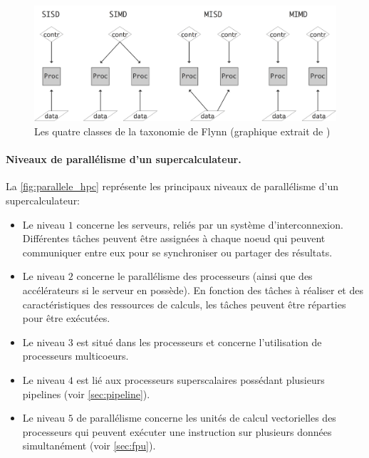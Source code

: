             
            \begin{figure}
            \center
            \includegraphics[width=12cm]{images/flynn.png}
            \caption{\label{fig:flynn} Les quatre classes de la taxonomie de Flynn (graphique extrait de \cite{Eijkhout2013})}
            \end{figure}
            

        \paragraph{Niveaux de parallélisme d'un supercalculateur.}
            La \autoref{fig:parallele_hpc} représente les principaux niveaux de parallélisme d'un supercalculateur:
            \begin{itemize}
                \item Le  niveau $1$ concerne les serveurs, reliés par un système d'interconnexion. Différentes tâches peuvent être assignées à chaque noeud qui peuvent communiquer entre eux pour se synchroniser ou partager des résultats. 
                
                \item Le niveau $2$ concerne le parallélisme des processeurs (ainsi que des accélérateurs si le serveur en possède). En fonction des tâches à réaliser et des caractéristiques des ressources de calculs, les tâches peuvent être réparties pour être exécutées.
                
                \item Le niveau $3$ est situé dans les processeurs et concerne l'utilisation de processeurs multicoeurs. 
                
                \item Le niveau $4$ est lié aux processeurs superscalaires possédant plusieurs pipelines (voir \autoref{sec:pipeline}). 
                
                \item Le niveau $5$ de parallélisme concerne les unités de calcul vectorielles des processeurs qui peuvent exécuter une instruction sur plusieurs données simultanément (voir \autoref{sec:fpu}).
            \end{itemize}
            
